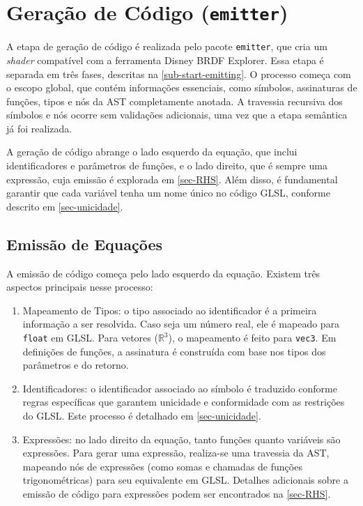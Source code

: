 
\section{Geração de Código (\texttt{emitter})} \label{section-emitter}


A etapa de geração de código é realizada pelo pacote \texttt{emitter}, que cria um \textit{shader} compatível com a ferramenta Disney BRDF Explorer. Essa etapa é separada em três fases, descritas na \autoref{sub-start-emitting}. O processo começa com o escopo global, que contém informações essenciais, como símbolos, assinaturas de funções, tipos e nós da AST completamente anotada. A travessia recursiva dos símbolos e nós ocorre sem validações adicionais, uma vez que a etapa semântica já foi realizada.

A geração de código abrange o lado esquerdo da equação, que inclui identificadores e parâmetros de funções, e o lado direito, que é sempre uma expressão, cuja emissão é explorada em \autoref{sec-RHS}. Além disso, é fundamental garantir que cada variável tenha um nome único no código GLSL, conforme descrito em \autoref{sec-unicidade}.

\subsection{Emissão de Equações} \label{subsection-emission}

A emissão de código começa pelo lado esquerdo da equação. Existem três aspectos principais nesse processo:
\begin{enumerate}
    \item Mapeamento de Tipos: o tipo associado ao identificador é a primeira informação a ser resolvida. Caso seja um número real, ele é mapeado para \verb"float" em GLSL. Para vetores ($\mathbb{R}^3$), o mapeamento é feito para \verb"vec3". Em definições de funções, a assinatura é construída com base nos tipos dos parâmetros e do retorno.

    \item Identificadores: o identificador associado ao símbolo é traduzido conforme regras específicas que garantem unicidade e conformidade com as restrições do GLSL. Este processo é detalhado em \autoref{sec-unicidade}.

    \item Expressões: no lado direito da equação, tanto funções quanto variáveis são expressões. Para gerar uma expressão, realiza-se uma travessia da AST, mapeando nós de expressões (como somas e chamadas de funções trigonométricas) para seu equivalente em GLSL. Detalhes adicionais sobre a emissão de código para expressões podem ser encontrados na \autoref{sec-RHS}.
\end{enumerate}



